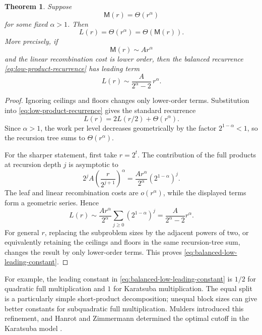 \documentclass[11pt]{book}
\newtheorem{theorem}{Theorem}[section]
\theoremstyle{definition}
\begin{document}
\begin{theorem}\label{thm:recursive-low-complexity}
Suppose
\[
 \mathsf M(r)=\Theta(r^\alpha)
\]
for some fixed $\alpha>1$.  Then
\[
 L(r)=\Theta(r^\alpha)=\Theta(\mathsf M(r)).
\]
More precisely, if
\[
 \mathsf M(r)\sim A r^\alpha
\]
and the linear recombination cost is lower order, then the balanced recurrence
\eqref{eq:low-product-recurrence} has leading term
\begin{equation}\label{eq:balanced-low-leading-constant}
 L(r)\sim \frac{A}{2^\alpha-2}\,r^\alpha.
\end{equation}
\end{theorem}

\begin{proof}
Ignoring ceilings and floors changes only lower-order terms.  Substitution into
\eqref{eq:low-product-recurrence} gives the standard recurrence
\[
 L(r)=2L(r/2)+\Theta(r^\alpha).
\]
Since $\alpha>1$, the work per level decreases geometrically by the factor
$2^{1-\alpha}<1$, so the recursion tree sums to $\Theta(r^\alpha)$.

For the sharper statement, first take $r=2^t$.  The contribution of the
full products at recursion depth $j$ is asymptotic to
\[
 2^j A\left(\frac{r}{2^{j+1}}\right)^\alpha
 =\frac{Ar^\alpha}{2^\alpha}
   \left(2^{1-\alpha}\right)^j.
\]
The leaf and linear recombination costs are $o(r^\alpha)$, while the displayed
terms form a geometric series.  Hence
\[
 L(r)\sim
 \frac{Ar^\alpha}{2^\alpha}
 \sum_{j\geq0}\left(2^{1-\alpha}\right)^j
 =\frac{A}{2^\alpha-2}r^\alpha.
\]
For general $r$, replacing the subproblem sizes by the adjacent powers of two,
or equivalently retaining the ceilings and floors in the same recursion-tree
sum, changes the result by only lower-order terms.  This proves
\eqref{eq:balanced-low-leading-constant}.
\end{proof}

For example, the leading constant in
\eqref{eq:balanced-low-leading-constant} is $1/2$ for quadratic full
multiplication and $1$ for Karatsuba multiplication.  The equal split is a
particularly simple short-product decomposition; unequal block sizes can give
better constants for subquadratic full multiplication.  Mulders introduced
this refinement, and Hanrot and Zimmermann determined the optimal cutoff in
the Karatsuba model \cite{Mulders2000,HanrotZimmermann2004}.
\end{document}
